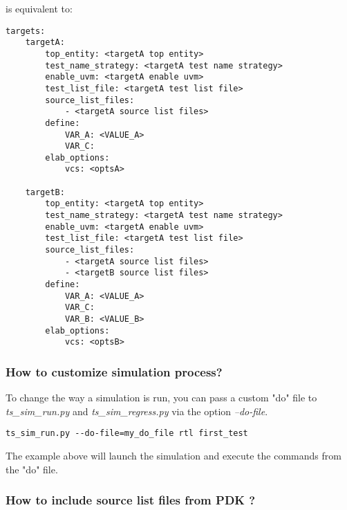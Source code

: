\documentclass{tropic_design_spec}
\begin{document}
is equivalent to:

\begin{lstlisting}
targets:
    targetA:
        top_entity: <targetA top entity>
        test_name_strategy: <targetA test name strategy>
        enable_uvm: <targetA enable uvm>
        test_list_file: <targetA test list file>
        source_list_files:
            - <targetA source list files>
        define:
            VAR_A: <VALUE_A>
            VAR_C:
        elab_options:
            vcs: <optsA>

    targetB:
        top_entity: <targetA top entity>
        test_name_strategy: <targetA test name strategy>
        enable_uvm: <targetA enable uvm>
        test_list_file: <targetA test list file>
        source_list_files:
            - <targetA source list files>
            - <targetB source list files>
        define:
            VAR_A: <VALUE_A>
            VAR_C:
            VAR_B: <VALUE_B>
        elab_options:
            vcs: <optsB>
\end{lstlisting}


\subsubsection{How to customize simulation process?}
\label{sec:how-to-customize-simulation-process}

To change the way a simulation is run, you can pass a custom "do" file to
\textit{ts_sim_run.py} and \textit{ts_sim_regress.py} via the option \textit{--do-file}.

\begin{lstlisting}
ts_sim_run.py --do-file=my_do_file rtl first_test
\end{lstlisting}

The example above will launch the simulation and execute the commands from the "do" file.


\subsubsection{How to include source list files from PDK ?}
\label{sec:how-include-source-list-files-from-pdk}
\end{document}
